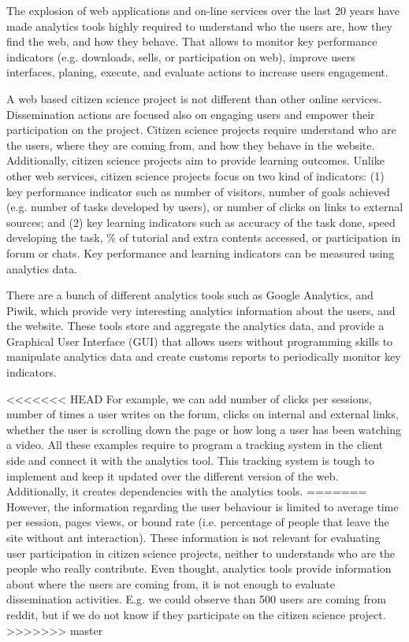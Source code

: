 \documentclass{article}
\begin{document}
The explosion of web applications and on-line services over the last 20 years have made analytics tools highly required to understand who the users are, how they find the web, and how they behave. That allows to monitor key performance indicators (e.g. downloads, sells, or participation on web), improve users interfaces, planing, execute, and evaluate actions to increase users engagement. 

A web based citizen science project is not  different than other online services. Dissemination actions are focused also on engaging users and empower their participation on the project. Citizen science projects require understand who are the users, where they are coming from, and how they behave in the website. Additionally, citizen science projects aim to provide learning outcomes. Unlike other web services, citizen science projects focus on two kind of indicators: (1) key performance indicator such as number of visitors, number of goals achieved (e.g. number of tasks developed by users), or number of clicks on links to external sources; and (2) key learning indicators such as accuracy of the task done, speed developing the task, \% of tutorial and extra contents accessed, or participation in forum or chats. Key performance and learning indicators can be measured using analytics data. 

There are a bunch of different analytics tools such as Google Analytics, and Piwik, which provide very interesting analytics information about the users, and the website. These tools store and aggregate the analytics data, and provide a Graphical User Interface (GUI) that allows users without programming skills to manipulate analytics data and create customs reports to periodically monitor key  indicators.  

<<<<<<< HEAD
 For example, we can add number of clicks per sessions, number of times a user writes on the forum, clicks on internal and external links, whether the user is scrolling down the page or how long a user has been watching a video. All these examples require to program a tracking system in the client side and connect it with the analytics tool. This tracking system is tough to implement and keep it updated over the different version of the web. Additionally, it creates dependencies with the analytics tools.
=======
However, the information regarding the user behaviour is limited to average time per session, pages views, or bound rate (i.e. percentage of people that leave the site without ant interaction). These information is not relevant for evaluating user participation in citizen science projects, neither to understands who are the people who really contribute. Even thought, analytics tools provide information about where the users are coming from, it is not enough to evaluate dissemination activities. E.g. we could observe than 500 users are coming from reddit, but if we do not know if they participate on the citizen science project. 
>>>>>>> master
\end{document}
